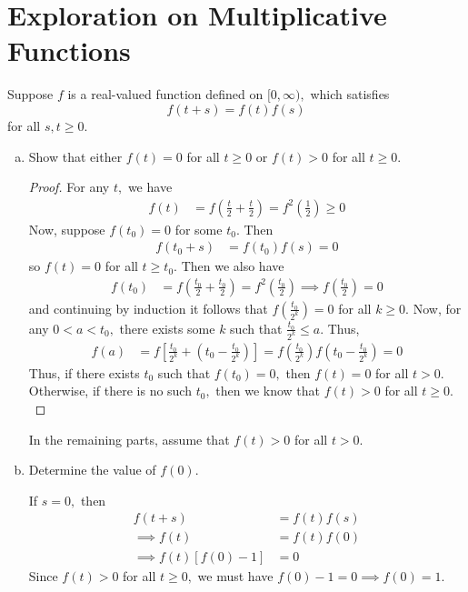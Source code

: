 \documentclass{article}
\begin{document}
\section*{Exploration on Multiplicative Functions}

Suppose $f$ is a real-valued function defined on $[0, \infty),$ which satisfies
	\[f(t+s) = f(t) f(s)\]
	for all $s, t\ge 0.$

	\begin{enumerate}[(a)]
		\item Show that either $f(t)=0$ for all $t\ge 0$ or $f(t)>0$ for all $t\ge 0.$

			\begin{proof}
				For any $t,$ we have
				\begin{align*}
					f(t) &= f\left( \frac{t}{2} + \frac{t}{2} \right) = f^2\left( \frac{1}{2} \right) \ge 0
				\end{align*}
				Now, suppose $f(t_0)=0$ for some $t_0.$ Then
				\begin{align*}
					f(t_0+s) &= f(t_0)f(s) = 0
				\end{align*}
				so $f(t)=0$ for all $t\ge t_0.$ Then we also have
				\begin{align*}
					f(t_0) &= f\left( \frac{t_0}{2} + \frac{t_0}{2} \right) = f^2\left( \frac{t_0}{2} \right) \implies f\left( \frac{t_0}{2} \right) = 0
				\end{align*}
				and continuing by induction it follows that $f\left( \frac{t_0}{2^{k}} \right) = 0$ for all $k\ge 0.$ Now, for any $0<a<t_0,$ there exists some $k$ such that $\frac{t_0}{2^k} \le a.$ Thus, 
				\begin{align*}
					f(a) &= f\left[ \frac{t_0}{2^k} + \left( t_0-\frac{t_0}{2^k} \right)\right] =  f\left( \frac{t_0}{2^k} \right) f\left( t_0-\frac{t_0}{2^k} \right) = 0
				\end{align*}
				Thus, if there exists $t_0$ such that $f(t_0)=0,$ then $f(t)=0$ for all $t>0.$ Otherwise, if there is no such $t_0,$ then we know that $f(t)>0$ for all $t\ge0.$ 
			\end{proof}

			In the remaining parts, assume that $f(t)>0$ for all $t>0.$

		\item Determine the value of $f(0).$
			\begin{soln}
				If $s=0,$ then
				\begin{align*}
					f(t+s) &= f(t)f(s) \\
					\implies f(t) &= f(t)f(0) \\
					\implies f(t)\left[ f(0)-1 \right] &= 0
				\end{align*}
				Since $f(t)>0$ for all $t\ge 0,$ we must have $f(0)-1=0\implies f(0)=\boxed1.$
			\end{soln}


\end{enumerate}
\end{document}
